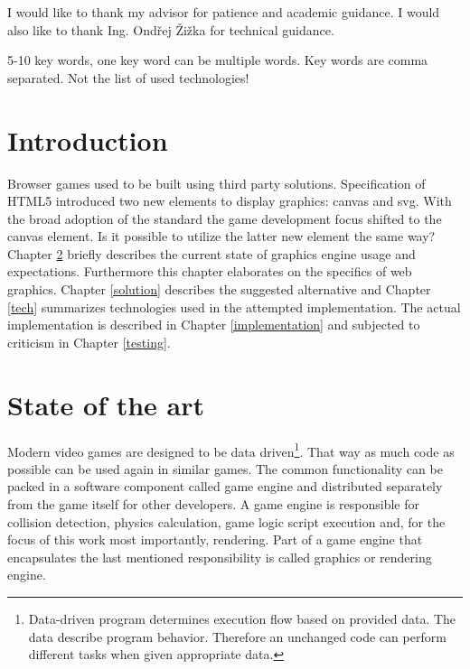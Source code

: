 \documentclass[11pt,oneside, final]{fithesis2}
\begin{document}
  
\FrontMatter  
\ThesisTitlePage  
 
\begin{ThesisDeclaration}  
\DeclarationText  
\AdvisorName  
\end{ThesisDeclaration}  
 
\begin{ThesisThanks}  
I would like to thank my advisor for patience and academic guidance. I would also like to thank Ing. Ondřej Žižka for technical guidance.
\end{ThesisThanks}  
 
\begin{ThesisAbstract}  

\end{ThesisAbstract}  
 
\begin{ThesisKeyWords}  
5-10 key words, one key word can be multiple words. Key words are comma separated. Not the list of used technologies!
\end{ThesisKeyWords}  
 
\MainMatter
 
\tableofcontents          %
 
\chapter{Introduction}
Browser games used to be built using third party solutions\cite{pagella}. Specification of HTML5 introduced two new elements to display graphics: canvas and svg\cite{w3_html5}. With the broad adoption of the standard the game development focus shifted to the canvas element\cite{pagella}. Is it possible to utilize the latter new element the same way? Chapter \ref{theory} briefly describes the current state of graphics engine usage and expectations. Furthermore this chapter elaborates on the specifics of web graphics. Chapter \ref{solution} describes the suggested alternative and Chapter \ref{tech} summarizes technologies used in the attempted implementation. The actual implementation is described in Chapter \ref{implementation} and subjected to criticism in Chapter \ref{testing}.

\chapter{State of the art}
\label{theory}

Modern video games are designed to be data driven\footnote{Data-driven program determines execution flow based on provided data. The data describe program behavior. Therefore an unchanged code can perform different tasks when given appropriate data.\cite{charniak}}. That way as much code as possible can be used again in similar games. The common functionality can be packed in a software component called game engine\cite{gregory} and distributed separately from the game itself for other developers. A game engine is responsible for collision detection, physics calculation, game logic script execution and, for the focus of this work most importantly, rendering. Part of a game engine that encapsulates the last mentioned responsibility is called graphics or rendering engine.
\end{document}
